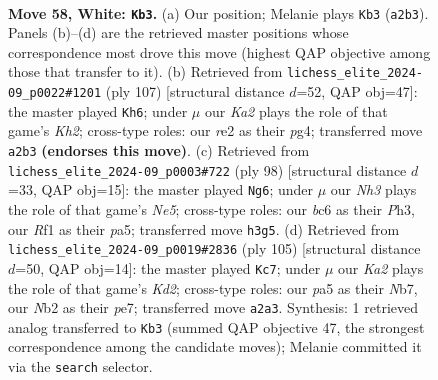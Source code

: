 \documentclass[11pt]{article}
\begin{document}
\clearpage

\begin{figure}[p]\centering
\begin{subfigure}{0.46\textwidth}\centering
\resizebox{\linewidth}{!}{%
\newchessgame
\chessboard[
  setfen={8/6k1/1pb5/p1p5/8/6PN/KNr1rp1P/5R2 w - - 2 58},
  showmover=false,
  pgfstyle=straightmove, color=movearrow, markmove={a2-b3}
]}
\caption{}
\end{subfigure}\hfill
\begin{subfigure}{0.46\textwidth}\centering
\resizebox{\linewidth}{!}{%
\newchessgame
\chessboard[
  setfen={8/p6k/1p6/5R1P/5nP1/P4r2/1P3P2/5K2 b - - 10 54},
  showmover=false,
  pgfstyle=straightmove, color=movearrow, markmove={h7-h6}
]}
\caption{}
\end{subfigure}
\\[4pt]
\begin{subfigure}{0.46\textwidth}\centering
\resizebox{\linewidth}{!}{%
\newchessgame
\chessboard[
  setfen={2r3k1/R5p1/2p4p/p1PpNPr1/8/7P/3K4/8 w - - 3 50},
  showmover=false,
  pgfstyle=straightmove, color=movearrow, markmove={e5-g6}
]}
\caption{}
\end{subfigure}\hfill
\begin{subfigure}{0.46\textwidth}\centering
\resizebox{\linewidth}{!}{%
\newchessgame
\chessboard[
  setfen={4r3/1n1kP3/8/p3R3/2P5/1P6/KP4b1/4R3 b - - 0 53},
  showmover=false,
  pgfstyle=straightmove, color=movearrow, markmove={d7-c7}
]}
\caption{}
\end{subfigure}
\caption{\textbf{Move 58, White: \texttt{Kb3}.} (a) Our position; Melanie plays \texttt{Kb3} (\texttt{a2b3}). Panels (b)--(d) are the retrieved master positions whose correspondence most drove this move (highest QAP objective among those that transfer to it). (b) Retrieved from \texttt{lichess\_elite\_2024-09\_p0022\#1201} (ply 107) [structural distance $d$=52, QAP obj=47]: the master played \texttt{Kh6}; under $\mu$ our \emph{Ka2} plays the role of that game's \emph{Kh2}; cross-type roles: our \emph{r}e2 as their \emph{p}g4; transferred move \texttt{a2b3} \textbf{(endorses this move)}. (c) Retrieved from \texttt{lichess\_elite\_2024-09\_p0003\#722} (ply 98) [structural distance $d$=33, QAP obj=15]: the master played \texttt{Ng6}; under $\mu$ our \emph{Nh3} plays the role of that game's \emph{Ne5}; cross-type roles: our \emph{b}c6 as their \emph{P}h3, our \emph{R}f1 as their \emph{p}a5; transferred move \texttt{h3g5}. (d) Retrieved from \texttt{lichess\_elite\_2024-09\_p0019\#2836} (ply 105) [structural distance $d$=50, QAP obj=14]: the master played \texttt{Kc7}; under $\mu$ our \emph{Ka2} plays the role of that game's \emph{Kd2}; cross-type roles: our \emph{p}a5 as their \emph{N}b7, our \emph{N}b2 as their \emph{p}e7; transferred move \texttt{a2a3}. Synthesis: 1 retrieved analog transferred to \texttt{Kb3} (summed QAP objective 47, the strongest correspondence among the candidate moves); Melanie committed it via the \texttt{search} selector.}
\label{fig:thought-m114}
\end{figure}
\end{document}
